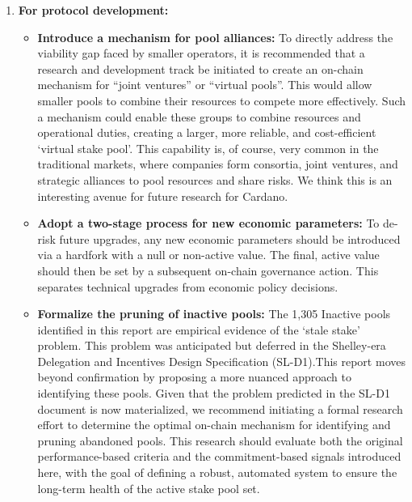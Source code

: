 \documentclass[11pt, letterpaper]{article}
\begin{document}
\begin{enumerate}
	\item \textbf{For protocol development:}
	      \begin{itemize}
		      \item \textbf{Introduce a mechanism for pool alliances:} To directly address the viability gap faced by
		            smaller operators, it is recommended that a research and development track be initiated to create an
		            on-chain mechanism for ``joint ventures'' or ``virtual pools''. This would allow smaller pools to combine
		            their resources to compete more effectively. Such a mechanism could enable these groups to combine resources
		            and operational duties, creating a larger, more reliable, and cost-efficient
		            `virtual stake pool'. This capability is, of course, very common in the traditional markets, where companies
		            form consortia, joint ventures, and strategic alliances to pool resources and share risks. We think this is an interesting avenue for
		            future research for Cardano.
		      \item \textbf{Adopt a two-stage process for new economic parameters:} To de-risk future upgrades, any
		            new economic parameters should be introduced via a hardfork with a null or non-active value. The final,
		            active value should then be set by a subsequent on-chain governance action. This separates technical
		            upgrades from economic policy decisions.
		      \item \textbf{Formalize the pruning of inactive pools:}  The 1,305 Inactive pools identified in this report are empirical
		            evidence of the `stale stake' problem. This problem was anticipated but deferred in the Shelley-era
		            Delegation and Incentives Design Specification (SL-D1).This report moves beyond confirmation by proposing a more nuanced approach to
		            identifying these pools. Given that the problem predicted in the SL-D1 document is now materialized, we
		            recommend initiating a formal research effort to determine the optimal on-chain mechanism for identifying and
		            pruning abandoned pools. This research should evaluate both the original performance-based criteria and the
		            commitment-based signals introduced here, with the goal of defining a robust, automated system to ensure the
		            long-term health of the active stake pool set.
	      \end{itemize}


\end{enumerate}
\end{document}
